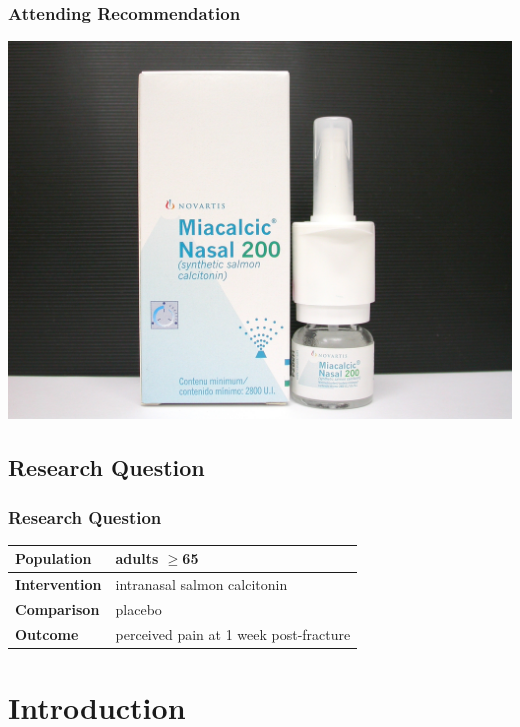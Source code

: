\documentclass{beamer}
\begin{document}
	\begin{frame}
	\frametitle{Attending Recommendation}
	\pause
	\centering
		\includegraphics[height=0.9\textheight,keepaspectratio]{media/calcitonin-02.jpg}
	\end{frame}
\subsection{Research Question}
	\begin{frame}
	\frametitle{Research Question}
	\centering
	\begin{tabular}{l|l}
		\hline
		\textbf{Population} & adults $\geq$65 
		\\
		\hline
		\textbf{Intervention} & intranasal salmon calcitonin
		\\
		\hline
		\textbf{Comparison} & placebo
		\\ 
		\hline
		\textbf{Outcome} &  perceived pain at 1 week post-fracture
		\\
		\hline
	\end{tabular}
	\end{frame}
\section{Introduction}
\end{document}
